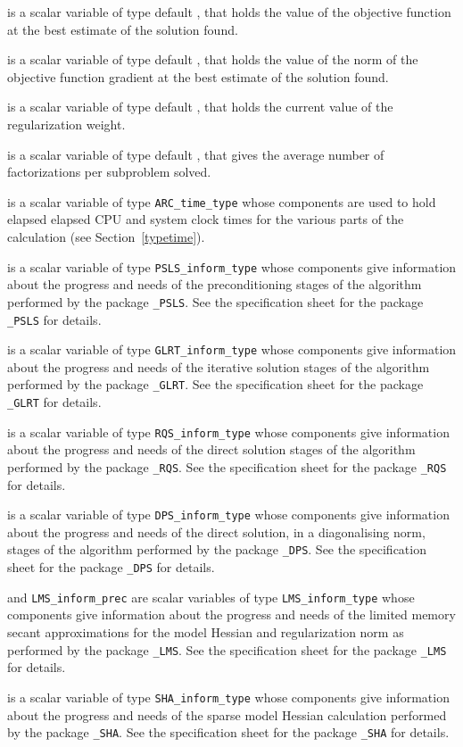 \documentclass{galahad}
\newcommand{\packagename}{ARC}
\begin{document}
\begin{description}
 is a scalar variable of type default \realdp, that holds the
value of the objective function at the best estimate of the solution found.

 is a scalar variable of type default \realdp, that holds the
value of the norm of the objective function gradient at the best estimate
of the solution found.

 is a scalar variable of type default \realdp, that holds
the current value of the regularization weight.

 is a scalar variable of type default \realdp, that
gives the average number of factorizations per subproblem solved.

 is a scalar variable of type {\tt \packagename\_time\_type}
whose components are used to hold elapsed elapsed CPU and system clock
times for the various parts of the calculation (see Section~\ref{typetime}).

 is a scalar variable of type
{\tt PSLS\_inform\_type}
whose components give information about the progress and needs
of the preconditioning stages of the algorithm performed by the package
{\tt \libraryname\_PSLS}.
See the specification sheet for the package
{\tt \libraryname\_PSLS}
for details.

 is a scalar variable of type
{\tt GLRT\_inform\_type}
whose components give information about the progress and needs
of the iterative solution stages of the algorithm performed by the package
{\tt \libraryname\_GLRT}.
See the specification sheet for the package
{\tt \libraryname\_GLRT}
for details.

 is a scalar variable of type
{\tt RQS\_inform\_type}
whose components give information about the progress and needs
of the direct solution stages of the algorithm performed by the package
{\tt \libraryname\_RQS}.
See the specification sheet for the package
{\tt \libraryname\_RQS}
for details.

 is a scalar variable of type
{\tt DPS\_inform\_type}
whose components give information about the progress and needs
of the direct solution, in a diagonalising norm,
stages of the algorithm performed by the package
{\tt \libraryname\_DPS}.
See the specification sheet for the package
{\tt \libraryname\_DPS}
for details.

  and {\tt LMS\_inform\_prec}
are scalar variables of type
{\tt LMS\_inform\_type}
whose components give information about the progress and needs
of the limited memory secant approximations for the model Hessian
and regularization norm as performed by the package
{\tt \libraryname\_LMS}.
See the specification sheet for the package
{\tt \libraryname\_LMS}
for details.

 is a scalar variable of type
{\tt SHA\_inform\_type}
whose components give information about the progress and needs
of the sparse model Hessian calculation performed by the package
{\tt \libraryname\_SHA}.
See the specification sheet for the package
{\tt \libraryname\_SHA}
for details.

\end{description}
\end{document}
